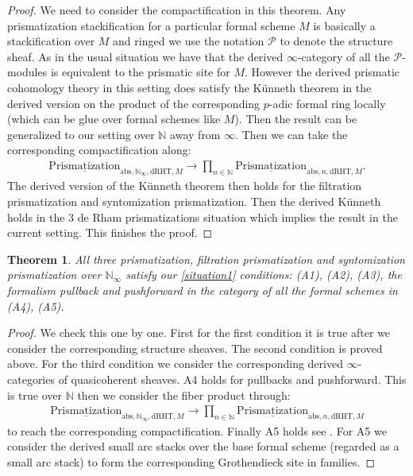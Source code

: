 \documentclass[12pt]{article}
\newtheorem{theorem}{Theorem}
\theoremstyle{definition}
\begin{document}
\begin{proof}
We need to consider the compactification in this theorem. Any prismatization  stackification for a particular formal scheme $M$ is basically a stackification over $M$ and ringed we use the notation $\mathcal{P}$ to denote the structure sheaf. As in the usual situation we have that the derived $\infty$-category of all the $\mathcal{P}$-modules is equivalent to the prismatic site for $M$. However the derived prismatic cohomology theory in this setting does satisfy the K\"unneth theorem in the derived version on the product of the corresponding $p$-adic formal ring locally (which can be glue over formal schemes like $M$). Then the result can be generalized to our setting over $\mathbb{N}$ away from $\infty$. Then we can take the corresponding compactification along:
\begin{align}
{\underline{\mathrm{Prismatization}}}_{\mathrm{abs},\mathbb{N}_\infty,\mathrm{dRHT},M}\rightarrow  \prod_{n\in \mathbb{N}} {\underline{\mathrm{Prismatization}}}_{\mathrm{abs},n,\mathrm{dRHT},M}.
\end{align}
The derived version of the K\"unneth theorem then holds for the filtration  prismatization and syntomization prismatization. Then the derived K\"unneth holds in the 3 de Rham prismatizations situation which implies the result in the current setting. This finishes the proof.
\end{proof}

\begin{theorem}
All three prismatization, filtration prismatization and syntomization prismatization over $\mathbb{N}_\infty$ satisfy our \cref{situation1} conditions: (A1), (A2), (A3), the formalism pullback and pushforward in the category of all the formal schemes in (A4), (A5).
\end{theorem}


\begin{proof}
We check this one by one. First for the first condition it is true after we consider the corresponding structure sheaves. The second condition is proved above. For the third condition we consider the corresponding derived $\infty$-categories of quasicoherent sheaves. A4 holds for pullbacks and pushforward. This is true over $\mathbb{N}$ then we consider the fiber product through:
\begin{align}
{\underline{\mathrm{Prismatization}}}_{\mathrm{abs},\mathbb{N}_\infty,\mathrm{dRHT},M}\rightarrow  \prod_{n\in \mathbb{N}} {\underline{\mathrm{Prismatization}}}_{\mathrm{abs},n,\mathrm{dRHT},M}
\end{align}
to reach the corresponding compactification. Finally A5 holds see \cite[Chapter 4, in particular 4.7, 4.8, 4.9, 4.10]{3A}. For A5 we consider the derived small arc stacks over the base formal scheme (regarded as a small arc stack) to form the corresponding Grothendieck site in families.
\end{proof}
\end{document}
